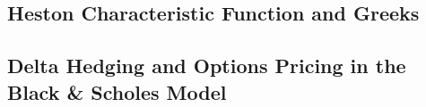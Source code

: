 \renewcommand\thesubsection{D}
\subsection{Heston Characteristic Function and Greeks}
% 
\clearpage

\renewcommand\thesubsection{E}
\subsection{Delta Hedging and Options Pricing in the Black \& Scholes Model}
% 
\clearpage

%











